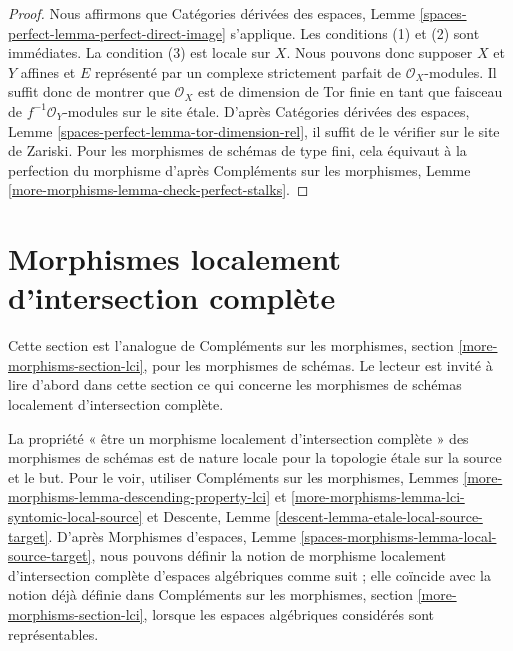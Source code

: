 \begin{proof}
Nous affirmons que Catégories dérivées des espaces, Lemme
\ref{spaces-perfect-lemma-perfect-direct-image} s'applique.
Les conditions (1) et (2) sont immédiates. La condition (3) est locale
sur $X$. Nous pouvons donc supposer $X$ et $Y$ affines et $E$
représenté par un complexe strictement parfait de $\mathcal{O}_X$-modules.
Il suffit donc de montrer que $\mathcal{O}_X$ est de dimension de Tor
finie en tant que faisceau de $f^{-1}\mathcal{O}_Y$-modules
sur le site étale. D'après Catégories dérivées des espaces, Lemme
\ref{spaces-perfect-lemma-tor-dimension-rel}, il suffit de
le vérifier sur le site de Zariski. Pour les morphismes de schémas de type fini,
cela équivaut à la perfection du morphisme d'après Compléments sur les morphismes,
Lemme \ref{more-morphisms-lemma-check-perfect-stalks}.
\end{proof}











\section{Morphismes localement d'intersection complète}
\label{section-lci}

\noindent
Cette section est l'analogue de
Compléments sur les morphismes, section \ref{more-morphisms-section-lci},
pour les morphismes de schémas. Le lecteur est invité à lire d'abord
dans cette section ce qui concerne les morphismes de schémas localement d'intersection complète.

\medskip\noindent
La propriété « être un morphisme localement d'intersection complète » des morphismes
de schémas est de nature locale pour la topologie étale sur la source et le but. Pour le voir, utiliser
Compléments sur les morphismes,
Lemmes \ref{more-morphisms-lemma-descending-property-lci} et
\ref{more-morphisms-lemma-lci-syntomic-local-source}
et
Descente, Lemme \ref{descent-lemma-etale-local-source-target}.
D'après
Morphismes d'espaces,
Lemme \ref{spaces-morphisms-lemma-local-source-target},
nous pouvons définir la notion de morphisme localement d'intersection complète
d'espaces algébriques comme suit ; elle coïncide avec la notion déjà
définie dans
Compléments sur les morphismes, section \ref{more-morphisms-section-lci},
lorsque les espaces algébriques considérés sont représentables.

